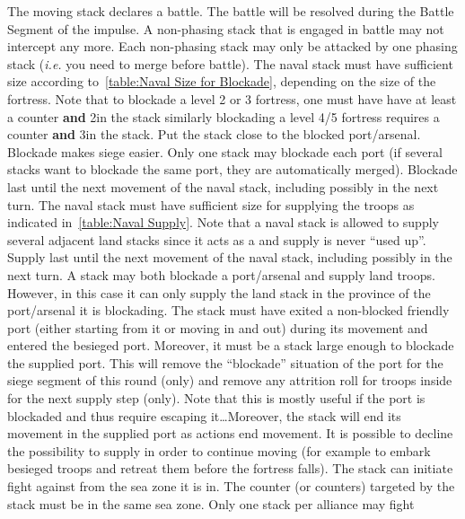 \bparag[Battle.] The moving stack declares a battle. The battle will be
resolved during the Battle Segment of the impulse. A non-phasing stack that is
engaged in battle may not intercept any more. Each non-phasing stack may only
be attacked by one phasing stack (\emph{i.e.} you need to merge before
battle).
 The naval stack must have
sufficient size according to~\ref{table:Naval Size for Blockade}, depending on
the size of the fortress. Note that to blockade a level 2 or 3 fortress, one
must have have at least a \FLEET\Facemoins counter \textbf{and} 2\ND in the
stack similarly blockading a level 4/5 fortress requires a \FLEET\Faceplus
counter \textbf{and} 3\ND in the stack. Put the stack close to the blocked
port/arsenal. Blockade makes siege easier. Only one stack may blockade each
port (if several stacks want to blockade the same port, they are automatically
merged). Blockade last until the next movement of the naval stack, including
possibly in the next turn.
 The naval stack must have sufficient size for
supplying the troops as indicated in~\ref{table:Naval Supply}. Note that a
naval stack is allowed to supply several adjacent land stacks since it acts as
a \SoS and supply is never ``used up''. Supply last until the next movement of
the naval stack, including possibly in the next turn.
 A stack may both blockade a port/arsenal and
supply land troops. However, in this case it can only supply the land stack in
the province of the port/arsenal it is blockading.
 The stack must have exited a non-blocked
friendly port (either starting from it or moving in and out) during its
movement and entered the besieged port. Moreover, it must be a stack large
enough to blockade the supplied port. This will remove the ``blockade''
situation of the port for the siege segment of this round (only) and remove
any attrition roll for troops inside for the next supply step (only). Note
that this is mostly useful if the port is blockaded and thus require escaping
it\ldots Moreover, the stack will end its movement in the supplied port as
actions end movement. It is possible to decline the possibility to supply in
order to continue moving (for example to embark besieged troops and retreat
them before the fortress falls).
 The stack can initiate fight against \corsaire from
the sea zone it is in. The \corsaire counter (or counters) targeted by the
stack must be in the same sea zone. Only one stack per alliance may fight
